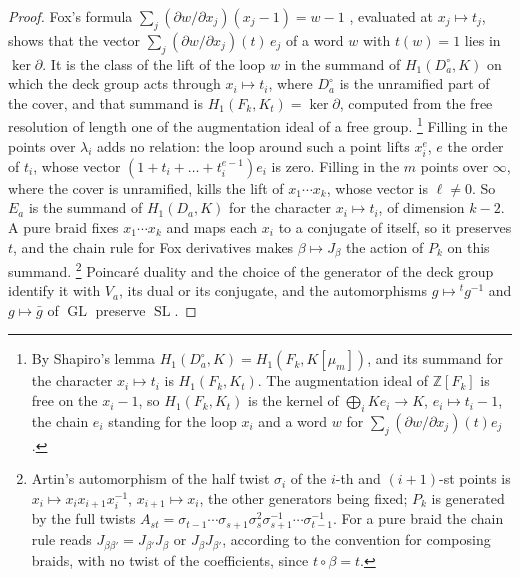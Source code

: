 \documentclass[11pt,reqno]{amsart}
\theoremstyle{plain}
\theoremstyle{definition}
\theoremstyle{remark}
\newcommand{\ZZ}{\mathbb{Z}}
\DeclareMathOperator{\GL}{GL}
\DeclareMathOperator{\SL}{SL}
\begin{document}
\begin{proof}
Fox's formula $\sum_{j}(\partial w/\partial x_{j})(x_{j}-1)=w-1$ \cite{Fox53},
evaluated at $x_{j}\mapsto t_{j}$, shows that the vector
$\sum_{j}(\partial w/\partial x_{j})(t)\,e_{j}$ of a word $w$ with $t(w)=1$ lies
in $\ker\partial$. It is the class of the lift of the loop $w$ in the summand
of $H_{1}(D_{a}^{\circ},K)$ on which the deck group acts through
$x_{i}\mapsto t_{i}$, where $D_{a}^{\circ}$ is the unramified part of the
cover, and that summand is $H_{1}(F_{k},K_{t})=\ker\partial$, computed from the
free resolution of length one of the augmentation ideal of a free group.%
\footnote{By Shapiro's lemma $H_{1}(D_{a}^{\circ},K)=H_{1}(F_{k},K[\mu_{m}])$,
and its summand for the character $x_{i}\mapsto t_{i}$ is $H_{1}(F_{k},K_{t})$.
The augmentation ideal of $\ZZ[F_{k}]$ is free on the $x_{i}-1$, so
$H_{1}(F_{k},K_{t})$ is the kernel of $\bigoplus_{i}Ke_{i}\to K$,
$e_{i}\mapsto t_{i}-1$, the chain $e_{i}$ standing for the loop $x_{i}$ and a word
$w$ for $\sum_{j}(\partial w/\partial x_{j})(t)e_{j}$.} Filling in the points
over $\lambda_{i}$ adds no relation: the loop around such a point lifts
$x_{i}^{e}$, $e$ the order of $t_{i}$, whose vector
$(1+t_{i}+\dots+t_{i}^{e-1})e_{i}$ is zero. Filling in the $m$ points over
$\infty$, where the cover is unramified, kills the lift of $x_{1}\cdots
x_{k}$, whose vector is $\ell\ne0$. So $E_{a}$ is the summand of
$H_{1}(D_{a},K)$ for the character $x_{i}\mapsto t_{i}$, of dimension $k-2$. A
pure braid fixes $x_{1}\cdots x_{k}$ and maps each $x_{i}$ to a conjugate of
itself, so it preserves $t$, and the chain rule for Fox derivatives makes
$\beta\mapsto J_{\beta}$ the action of $P_{k}$ on this summand.%
\footnote{Artin's automorphism of the half twist $\sigma_{i}$ of the $i$-th
and $(i+1)$-st points is $x_{i}\mapsto x_{i}x_{i+1}x_{i}^{-1}$,
$x_{i+1}\mapsto x_{i}$, the other generators being fixed; $P_{k}$ is generated
by the full twists $A_{st}=\sigma_{t-1}\cdots\sigma_{s+1}\sigma_{s}^{2}
\sigma_{s+1}^{-1}\cdots\sigma_{t-1}^{-1}$. For a pure braid the chain rule
reads $J_{\beta\beta'}=J_{\beta'}J_{\beta}$ or $J_{\beta}J_{\beta'}$, according
to the convention for composing braids, with no twist of the coefficients,
since $t\circ\beta=t$.} Poincar\'e duality and the choice of the generator
of the deck group identify it with $V_{a}$, its dual or its conjugate, and
the automorphisms $g\mapsto{}^{t}g^{-1}$ and $g\mapsto\bar g$ of $\GL$ preserve
$\SL$.
\end{proof}
\end{document}

